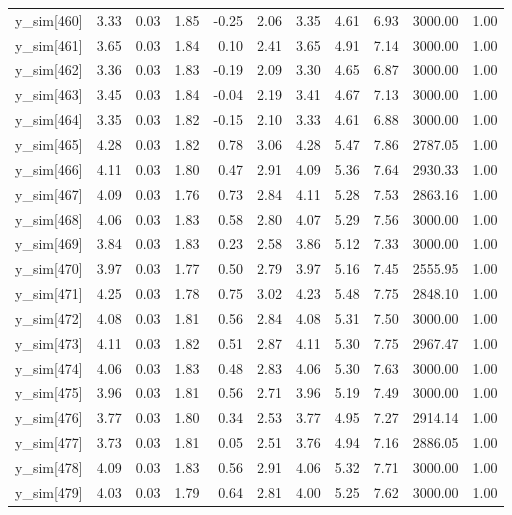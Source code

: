 \begin{table}[ht]
\begin{tabular}{rrrrrrrrrrr}
  y\_sim[460] & 3.33 & 0.03 & 1.85 & -0.25 & 2.06 & 3.35 & 4.61 & 6.93 & 3000.00 & 1.00 \\ 
  y\_sim[461] & 3.65 & 0.03 & 1.84 & 0.10 & 2.41 & 3.65 & 4.91 & 7.14 & 3000.00 & 1.00 \\ 
  y\_sim[462] & 3.36 & 0.03 & 1.83 & -0.19 & 2.09 & 3.30 & 4.65 & 6.87 & 3000.00 & 1.00 \\ 
  y\_sim[463] & 3.45 & 0.03 & 1.84 & -0.04 & 2.19 & 3.41 & 4.67 & 7.13 & 3000.00 & 1.00 \\ 
  y\_sim[464] & 3.35 & 0.03 & 1.82 & -0.15 & 2.10 & 3.33 & 4.61 & 6.88 & 3000.00 & 1.00 \\ 
  y\_sim[465] & 4.28 & 0.03 & 1.82 & 0.78 & 3.06 & 4.28 & 5.47 & 7.86 & 2787.05 & 1.00 \\ 
  y\_sim[466] & 4.11 & 0.03 & 1.80 & 0.47 & 2.91 & 4.09 & 5.36 & 7.64 & 2930.33 & 1.00 \\ 
  y\_sim[467] & 4.09 & 0.03 & 1.76 & 0.73 & 2.84 & 4.11 & 5.28 & 7.53 & 2863.16 & 1.00 \\ 
  y\_sim[468] & 4.06 & 0.03 & 1.83 & 0.58 & 2.80 & 4.07 & 5.29 & 7.56 & 3000.00 & 1.00 \\ 
  y\_sim[469] & 3.84 & 0.03 & 1.83 & 0.23 & 2.58 & 3.86 & 5.12 & 7.33 & 3000.00 & 1.00 \\ 
  y\_sim[470] & 3.97 & 0.03 & 1.77 & 0.50 & 2.79 & 3.97 & 5.16 & 7.45 & 2555.95 & 1.00 \\ 
  y\_sim[471] & 4.25 & 0.03 & 1.78 & 0.75 & 3.02 & 4.23 & 5.48 & 7.75 & 2848.10 & 1.00 \\ 
  y\_sim[472] & 4.08 & 0.03 & 1.81 & 0.56 & 2.84 & 4.08 & 5.31 & 7.50 & 3000.00 & 1.00 \\ 
  y\_sim[473] & 4.11 & 0.03 & 1.82 & 0.51 & 2.87 & 4.11 & 5.30 & 7.75 & 2967.47 & 1.00 \\ 
  y\_sim[474] & 4.06 & 0.03 & 1.83 & 0.48 & 2.83 & 4.06 & 5.30 & 7.63 & 3000.00 & 1.00 \\ 
  y\_sim[475] & 3.96 & 0.03 & 1.81 & 0.56 & 2.71 & 3.96 & 5.19 & 7.49 & 3000.00 & 1.00 \\ 
  y\_sim[476] & 3.77 & 0.03 & 1.80 & 0.34 & 2.53 & 3.77 & 4.95 & 7.27 & 2914.14 & 1.00 \\ 
  y\_sim[477] & 3.73 & 0.03 & 1.81 & 0.05 & 2.51 & 3.76 & 4.94 & 7.16 & 2886.05 & 1.00 \\ 
  y\_sim[478] & 4.09 & 0.03 & 1.83 & 0.56 & 2.91 & 4.06 & 5.32 & 7.71 & 3000.00 & 1.00 \\ 
  y\_sim[479] & 4.03 & 0.03 & 1.79 & 0.64 & 2.81 & 4.00 & 5.25 & 7.62 & 3000.00 & 1.00 \\ 

\end{tabular}
\end{table}
